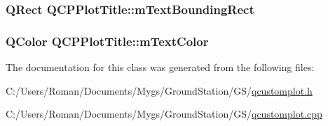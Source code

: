 \subsubsection[{m\+Text\+Bounding\+Rect}]{\setlength{\rightskip}{0pt plus 5cm}Q\+Rect Q\+C\+P\+Plot\+Title\+::m\+Text\+Bounding\+Rect\hspace{0.3cm}{\ttfamily [protected]}}\label{class_q_c_p_plot_title_a7178a0f6c1e633c144c17b4de4e0b840}
\hypertarget{class_q_c_p_plot_title_a5d7f834d6522c1a72fb0682c0b7ebe13}{}
\subsubsection[{m\+Text\+Color}]{\setlength{\rightskip}{0pt plus 5cm}Q\+Color Q\+C\+P\+Plot\+Title\+::m\+Text\+Color\hspace{0.3cm}{\ttfamily [protected]}}\label{class_q_c_p_plot_title_a5d7f834d6522c1a72fb0682c0b7ebe13}


The documentation for this class was generated from the following files\+:\begin{DoxyCompactItemize}
\item 
C\+:/\+Users/\+Roman/\+Documents/\+Mygs/\+Ground\+Station/\+G\+S/\hyperlink{qcustomplot_8h}{qcustomplot.\+h}\item 
C\+:/\+Users/\+Roman/\+Documents/\+Mygs/\+Ground\+Station/\+G\+S/\hyperlink{qcustomplot_8cpp}{qcustomplot.\+cpp}\end{DoxyCompactItemize}
